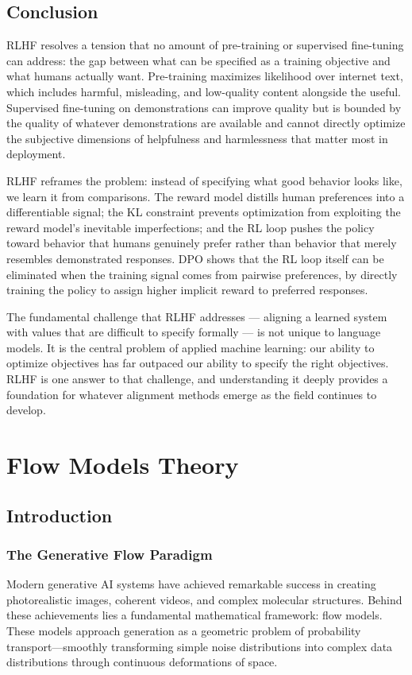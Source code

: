 \documentclass{book}
\begin{document}
\section{Conclusion}
\label{sec:rlhf_conclusion}

RLHF resolves a tension that no amount of pre-training or supervised
fine-tuning can address: the gap between what can be specified as a
training objective and what humans actually want. Pre-training maximizes
likelihood over internet text, which includes harmful, misleading, and
low-quality content alongside the useful. Supervised fine-tuning on
demonstrations can improve quality but is bounded by the quality of
whatever demonstrations are available and cannot directly optimize the
subjective dimensions of helpfulness and harmlessness that matter most in
deployment.

RLHF reframes the problem: instead of specifying what good behavior looks
like, we learn it from comparisons. The reward model distills human
preferences into a differentiable signal; the KL constraint prevents
optimization from exploiting the reward model's inevitable imperfections;
and the RL loop pushes the policy toward behavior that humans genuinely
prefer rather than behavior that merely resembles demonstrated responses.
DPO shows that the RL loop itself can be eliminated when the training
signal comes from pairwise preferences, by directly training the policy
to assign higher implicit reward to preferred responses.

The fundamental challenge that RLHF addresses --- aligning a learned system
with values that are difficult to specify formally --- is not unique to
language models. It is the central problem of applied machine learning:
our ability to optimize objectives has far outpaced our ability to specify
the right objectives. RLHF is one answer to that challenge, and
understanding it deeply provides a foundation for whatever alignment
methods emerge as the field continues to develop.

\chapter{Flow Models Theory}

\section{Introduction}

\subsection{The Generative Flow Paradigm}
Modern generative AI systems have achieved remarkable success in creating photorealistic images, coherent videos, and complex molecular structures. Behind these achievements lies a fundamental mathematical framework: flow models. These models approach generation as a geometric problem of probability transport—smoothly transforming simple noise distributions into complex data distributions through continuous deformations of space.
\end{document}
